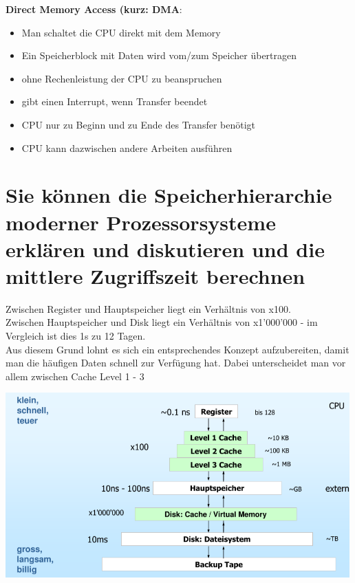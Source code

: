 \documentclass{report}
\newenvironment{Figure}
	{\par\medskip\noindent\minipage{\linewidth}}
	{\endminipage\par\medskip}
\theoremstyle{definition}
\theoremstyle{example}
\begin{document}
\textbf{Direct Memory Access (kurz: DMA}:\\
\begin{itemize}
	\item Man schaltet die CPU direkt mit dem Memory
	\item Ein Speicherblock mit Daten wird vom/zum Speicher übertragen
	\item ohne Rechenleistung der CPU zu beanspruchen
	\item gibt einen Interrupt, wenn Transfer beendet
	\item CPU nur zu Beginn und zu Ende des Transfer benötigt
	\item CPU kann dazwischen andere Arbeiten ausführen
\end{itemize}

\section{Sie können die Speicherhierarchie moderner Prozessorsysteme erklären und diskutieren und die mittlere Zugriffszeit berechnen}
Zwischen Register und Hauptspeicher liegt ein Verhältnis von x100.\\


Zwischen Hauptspeicher und Disk liegt ein Verhältnis von x1'000'000 - im Vergleich ist dies 1s zu 12 Tagen. \\

Aus diesem Grund lohnt es sich ein entsprechendes Konzept aufzubereiten, damit man die häufigen Daten schnell zur Verfügung hat. Dabei unterscheidet man vor allem zwischen Cache Level 1 - 3
\begin{Figure}
\centering
\includegraphics[width=500px]{img/Speicherhierarchie.png}
	\label{fig:Speicherhierarchie}
\end{Figure}
\end{document}
